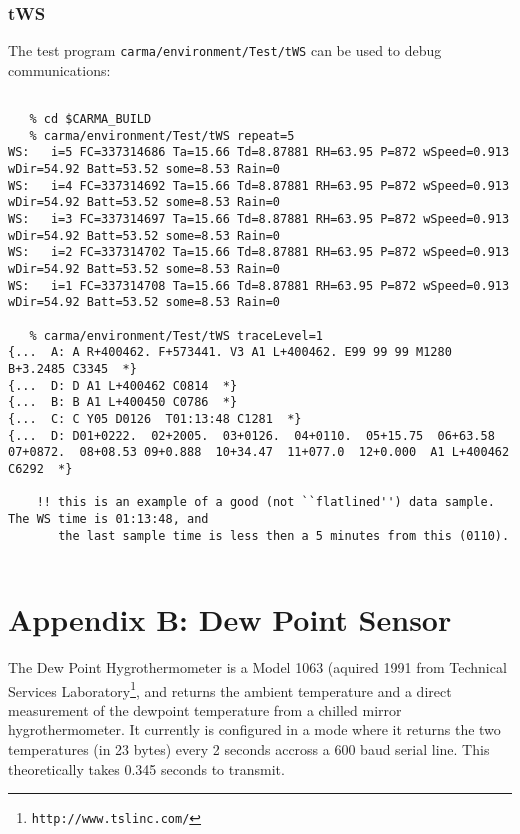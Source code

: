 \documentclass[11pt]{article}
\begin{document}
\subsubsection{tWS}

The test program {\tt carma/environment/Test/tWS} can be used to debug communications:

\footnotesize
\begin{verbatim}

   % cd $CARMA_BUILD
   % carma/environment/Test/tWS repeat=5
WS:   i=5 FC=337314686 Ta=15.66 Td=8.87881 RH=63.95 P=872 wSpeed=0.913 wDir=54.92 Batt=53.52 some=8.53 Rain=0
WS:   i=4 FC=337314692 Ta=15.66 Td=8.87881 RH=63.95 P=872 wSpeed=0.913 wDir=54.92 Batt=53.52 some=8.53 Rain=0
WS:   i=3 FC=337314697 Ta=15.66 Td=8.87881 RH=63.95 P=872 wSpeed=0.913 wDir=54.92 Batt=53.52 some=8.53 Rain=0
WS:   i=2 FC=337314702 Ta=15.66 Td=8.87881 RH=63.95 P=872 wSpeed=0.913 wDir=54.92 Batt=53.52 some=8.53 Rain=0
WS:   i=1 FC=337314708 Ta=15.66 Td=8.87881 RH=63.95 P=872 wSpeed=0.913 wDir=54.92 Batt=53.52 some=8.53 Rain=0

   % carma/environment/Test/tWS traceLevel=1
{...  A: A R+400462. F+573441. V3 A1 L+400462. E99 99 99 M1280   B+3.2485 C3345  *}
{...  D: D A1 L+400462 C0814  *}
{...  B: B A1 L+400450 C0786  *}
{...  C: C Y05 D0126  T01:13:48 C1281  *}
{...  D: D01+0222.  02+2005.  03+0126.  04+0110.  05+15.75  06+63.58  07+0872.  08+08.53 09+0.888  10+34.47  11+077.0  12+0.000  A1 L+400462 C6292  *}

    !! this is an example of a good (not ``flatlined'') data sample. The WS time is 01:13:48, and
       the last sample time is less then a 5 minutes from this (0110).
       
\end{verbatim}
\normalsize

\newpage
\section{Appendix B: Dew Point Sensor}


The Dew Point Hygrothermometer is a Model 1063 
(aquired 1991 from Technical Services 
Laboratory\footnote{{\tt http://www.tslinc.com/}}, 
and returns the ambient temperature 
and a direct measurement of the dewpoint temperature 
from a chilled mirror hygrothermometer.  It currently
is configured in a mode where it returns the two
temperatures (in 23 bytes) every 2 seconds accross
a 600 baud serial line. This theoretically
takes 0.345 seconds to transmit.
\end{document}
